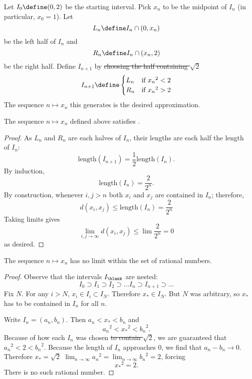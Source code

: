 \documentclass{scrartcl}
\newcommand{\dist}{d}
\begin{document}
\begin{defn}

  Let \(I_{0}\define(0,2)\) be the starting interval. Pick \(x_{n}\) to be the midpoint of \(I_{n}\) (in particular, \(x_{0}=1\)). Let \[L_{n}\define I_{n}\cap (0,x_{n})\] be the left half of \(I_{n}\) and
  \[R_{n}\define I_{n}\cap (x_{n},2)\] be the right half.
  Define \(I_{{n+1}}\) by \sout{choosing the half containing \(\sqrt 2\)}
  \[
    I_{{n+1}} \define
    \begin{cases}
      L_{n}& \textrm{if } {x_{n}}^{2} < 2 \\
      R_{n}& \textrm{if } {x_{n}}^{2} > 2
    \end{cases}
  \]
  The sequence \(n \mapsto x_{n}\) this generates is the desired approximation.
\end{defn}
\begin{theorem}
  The sequence \(n\mapsto x_{n}\) defined above satisfies .
\end{theorem}
\begin{proof}
  As \(L_{n}\) and \(R_{n}\) are each halves of \(I_{n}\), their lengths are each half the length of \(I_{n}\):
  \[
    \textrm{length}(I_{n+1}) = \frac 1 2 \textrm{length}(I_{n}).
  \]
  By induction, \[
    \textrm{length}(I_{n}) = \frac{2}{2^{n}}.
  \]
  By construction, whenever \(i,j > n\) both \(x_{i}\) and \(x_{j}\) are contained in \(I_{n}\); therefore,
  \[
    \dist(x_{i},x_{j}) \leq \textrm{length}(I_{n}) = \frac{2}{2^{n}}
  \]
  Taking limits gives
  \[
    \lim_{{i,j}\to\infty} \dist(x_{i},x_{j}) \leq \lim \frac{2}{2^{n}} = 0
  \]
  as desired.
\end{proof}

\begin{theorem}
  The sequence \(n\mapsto x_{n}\) has no limit within the set of rational numbers.
\end{theorem}
\begin{proof}
  Observe that the intervals \(I_{\blank}\) are nested:
  \[
    I_{0} \supset I_{1} \supset I_{2} \supset \dots I_{n} \supset I_{n+1} \supset \dots
  \]
  Fix \(N\). For any \(i> N\), \(x_{i}\in I_{i} \subset I_{N}\). Therefore \(x_{*}\in I_{N}\). But \(N\) was arbitrary, so \(x_{*}\) has to be contained in \(I_{n}\) for all \(n\).

  Write \(I_{n} = (a_{n},b_{n})\). Then \(a_{n}< x_{*} < b_{n}\) and
  \[{a_{n}}^{2} < {x_{*}}^{2} < {b_{n}}^{2}.\]
  Because of how each \(I_{n}\) was chosen \sout{to contain \(\sqrt 2\)}, we are guaranteed that \({a_{n}}^{2}< 2 < {b_{n}}^{2}\). Because the length of \(I_{n}\) approaches \(0\), we find that \(a_{n}-b_{n}\to 0\). Therefore \sout{\(x_{*}=\sqrt 2\)} \(\lim_{{n\to\infty}} {a_{n}}^{2}=\lim_{{n\to\infty}}{b_{n}}^{2} = 2\), forcing
  \[
    {x_{*}}^{2} = 2.
  \]
  There is no such rational number.
\end{proof}
\end{document}
